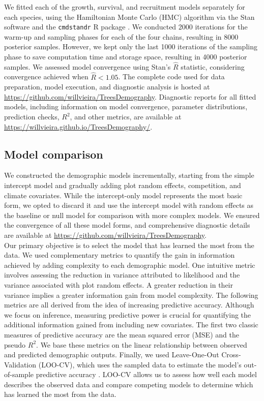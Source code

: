 We fitted each of the growth, survival, and recruitment models
separately for each species, using the Hamiltonian Monte Carlo (HMC)
algorithm via the Stan software \citep[version 2.30.1][]{stan2022stan}
and the \texttt{cmdstandr} R package \citep[version 0.5.3][]{cmdstanr}.
We conducted 2000 iterations for the warm-up and sampling phases for
each of the four chains, resulting in 8000 posterior samples. However,
we kept only the last 1000 iterations of the sampling phase to save
computation time and storage space, resulting in 4000 posterior samples.
We assessed model convergence using Stan's \(\hat{R}\) statistic,
considering convergence achieved when \(\hat{R} < 1.05\). The complete
code used for data preparation, model execution, and diagnostic analysis
is hosted at \url{https://github.com/willvieira/TreesDemography}.
Diagnostic reports for all fitted models, including information on model
convergence, parameter distributions, prediction checks, \(R^2\), and
other metrics, are available at
\url{https://willvieira.github.io/TreesDemography/}.\\

\hypertarget{model-comparison}{%
\subsection{Model comparison}\label{model-comparison}}

We constructed the demographic models incrementally, starting from the
simple intercept model and gradually adding plot random effects,
competition, and climate covariates. While the intercept-only model
represents the most basic form, we opted to discard it and use the
intercept model with random effects as the baseline or null model for
comparison with more complex models. We ensured the convergence of all
these model forms, and comprehensive diagnostic details are available at
\url{https://github.com/willvieira/TreesDemography}.\\

Our primary objective is to select the model that has learned the most
from the data. We used complementary metrics to quantify the gain in
information achieved by adding complexity to each demographic model. One
intuitive metric involves assessing the reduction in variance attributed
to likelihood and the variance associated with plot random effects. A
greater reduction in their variance implies a greater information gain
from model complexity. The following metrics are all derived from the
idea of increasing predictive accuracy. Although we focus on inference,
measuring predictive power is crucial for quantifying the additional
information gained from including new covariates. The first two classic
measures of predictive accuracy are the mean squared error (MSE) and the
pseudo \(R^2\). We base these metrics on the linear relationship between
observed and predicted demographic outputs. Finally, we used
Leave-One-Out Cross-Validation (LOO-CV), which uses the sampled data to
estimate the model's out-of-sample predictive accuracy
\citep{vehtari2017practical}. LOO-CV allows us to assess how well each
model describes the observed data and compare competing models to
determine which has learned the most from the data.\\

